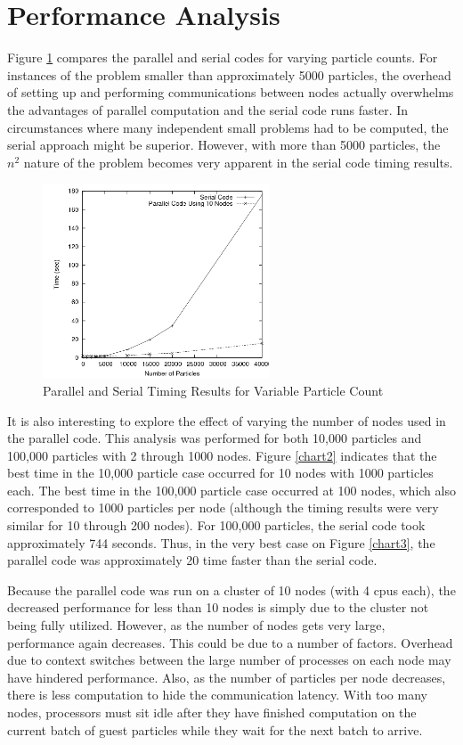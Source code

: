 \documentclass{article}
\begin{document}
\section{Performance Analysis}
Figure \ref{chart1} compares the parallel and serial codes for varying particle counts. For instances of the problem smaller than approximately 5000 particles, the overhead of setting up and performing communications between nodes actually overwhelms the advantages of parallel computation and the serial code runs faster. In circumstances where many independent small problems had to be computed, the serial approach might be superior. However, with more than 5000 particles, the \(n^2\) nature of the problem becomes very apparent in the serial code timing results.

\begin{figure}
\centering
\includegraphics[width=0.6\textwidth]{img/timing_data_variable_particles.png}
\caption{Parallel and Serial Timing Results for Variable Particle Count}
\label{chart1}
\end{figure}

It is also interesting to explore the effect of varying the number of nodes used in the parallel code. This analysis was performed for both 10,000 particles and 100,000 particles with 2 through 1000 nodes. Figure \ref{chart2} indicates that the best time in the 10,000 particle case occurred for 10 nodes with 1000 particles each. The best time in the 100,000 particle case occurred at 100 nodes, which also corresponded to 1000 particles per node (although the timing results were very similar for 10 through 200 nodes). For 100,000 particles, the serial code took approximately 744 seconds. Thus, in the very best case on Figure \ref{chart3}, the parallel code was approximately 20 time faster than the serial code.

Because the parallel code was run on a cluster of 10 nodes (with 4 cpus each), the decreased performance for less than 10 nodes is simply due to the cluster not being fully utilized. However, as the number of nodes gets very large, performance again decreases. This could be due to a number of factors. Overhead due to context switches between the large number of processes on each node may have hindered performance. Also, as the number of particles per node decreases, there is less computation to hide the communication latency. With too many nodes, processors must sit idle after they have finished computation on the current batch of guest particles while they wait for the next batch to arrive.
\end{document}
